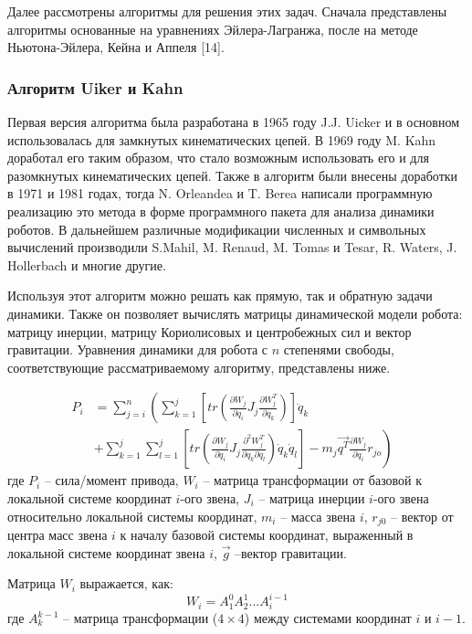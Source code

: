 Далее рассмотрены алгоритмы для решения этих задач. Сначала представлены алгоритмы основанные на уравнениях Эйлера-Лагранжа, после на методе Ньютона-Эйлера, Кейна и Аппеля [14].

\subsubsection{Алгоритм Uiker и Kahn}
Первая версия алгоритма была разработана в 1965 году J.J. Uicker и в основном использовалась для замкнутых кинематических цепей. В 1969 году M. Kahn доработал его таким образом, что стало возможным использовать его и для разомкнутых кинематических цепей. Также в алгоритм были внесены доработки в 1971 и 1981 годах, тогда N. Orleandea и T. Berea написали программную реализацию это метода в форме программного пакета для анализа динамики роботов. В дальнейшем различные модификации численных и символьных вычислений производили S.Mahil, M. Renaud, M. Tomas и Tesar, R. Waters, J. Hollerbach и многие другие.

Используя этот алгоритм можно решать как прямую, так и обратную задачи динамики. Также он позволяет вычислять матрицы динамической модели робота: матрицу инерции, матрицу Кориолисовых и центробежных сил и вектор гравитации. Уравнения динамики для робота с $n$ степенями свободы, соответствующие рассматриваемому алгоритму, представлены ниже.

\begin{align}\label{eq1}
P_i &= \sum_{j=i}^{n}
\left(
\sum_{k=1}^{j}
\left[
tr(\frac{\partial W_j}{\partial q_i} J_j \frac{\partial W_j^T}{\partial q_k})
\right] \ddot q_k 
\right.&\\
&+
\left.
\sum_{k=1}^{j} \sum_{l=1}^{j} 
\left[
tr(\frac{\partial W_j}{\partial q_i} J_j \frac{\partial^2 W_j^T}{\partial q_k \partial q_l})\dot q_k \dot q_l
\right]
-m_j \vec{q^T} \frac{\partial W_j}{\partial q_i} r_{jo}
\right)
\end{align}
где $P_i$ -- сила/момент привода, $W_i$ -- матрица трансформации от базовой к локальной системе координат $i$-ого звена, $J_i$ -- матрица инерции $i$-ого звена относительно локальной системы координат, $m_i$ -- масса звена $i$, $r_{j0}$ -- вектор от центра масс звена $i$ к началу базовой системы координат, выраженный в локальной системе координат звена $i$, $\vec g$ --вектор гравитации.

Матрица $W_i$ выражается, как:
\begin{equation}
W_i = A_1^0 A_2^1 ... A_i^{i-1}
\end{equation}
где $A_k^{k-1}$ -- матрица трансформации ($4 \times 4$) между системами координат $i$ и $i-1$.

